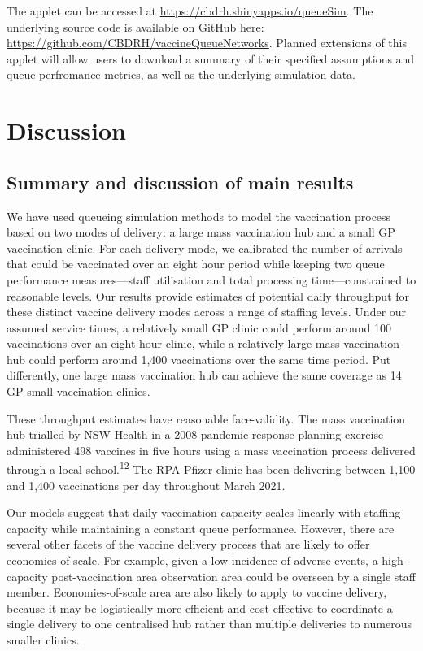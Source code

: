 \documentclass{article}
\begin{document}
The applet can be accessed at \url{https://cbdrh.shinyapps.io/queueSim}.
The underlying source code is available on GitHub here:
\url{https://github.com/CBDRH/vaccineQueueNetworks}. Planned extensions
of this applet will allow users to download a summary of their specified
assumptions and queue perfromance metrics, as well as the underlying
simulation data.

\hypertarget{discussion}{%
\section{Discussion}\label{discussion}}

\hypertarget{summary-and-discussion-of-main-results}{%
\subsection{Summary and discussion of main
results}\label{summary-and-discussion-of-main-results}}

We have used queueing simulation methods to model the vaccination
process based on two modes of delivery: a large mass vaccination hub and
a small GP vaccination clinic. For each delivery mode, we calibrated the
number of arrivals that could be vaccinated over an eight hour period
while keeping two queue performance measures---staff utilisation and
total processing time---constrained to reasonable levels. Our results
provide estimates of potential daily throughput for these distinct
vaccine delivery modes across a range of staffing levels. Under our
assumed service times, a relatively small GP clinic could perform around
100 vaccinations over an eight-hour clinic, while a relatively large
mass vaccination hub could perform around 1,400 vaccinations over the
same time period. Put differently, one large mass vaccination hub can
achieve the same coverage as 14 GP small vaccination clinics.

These throughput estimates have reasonable face-validity. The mass
vaccination hub trialled by NSW Health in a 2008 pandemic response
planning exercise administered 498 vaccines in five hours using a mass
vaccination process delivered through a local
school.\textsuperscript{12} The RPA Pfizer clinic has been delivering
between 1,100 and 1,400 vaccinations per day throughout March 2021.

Our models suggest that daily vaccination capacity scales linearly with
staffing capacity while maintaining a constant queue performance.
However, there are several other facets of the vaccine delivery process
that are likely to offer economies-of-scale. For example, given a low
incidence of adverse events, a high-capacity post-vaccination area
observation area could be overseen by a single staff member.
Economies-of-scale area are also likely to apply to vaccine delivery,
because it may be logistically more efficient and cost-effective to
coordinate a single delivery to one centralised hub rather than multiple
deliveries to numerous smaller clinics.
\end{document}
